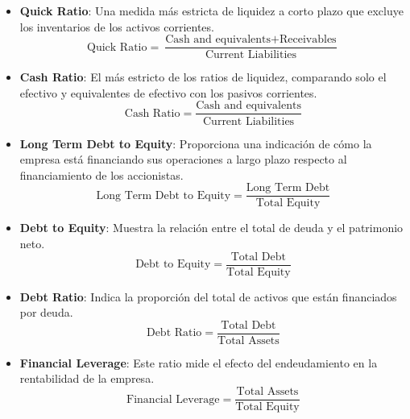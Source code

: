 \documentclass{article}
\begin{document}
\begin{itemize}
    \item \textbf{Quick Ratio}: Una medida más estricta de liquidez a corto plazo que excluye los inventarios de los activos corrientes.
    \begin{equation*}
        \text{Quick Ratio} = \frac{\text{Cash and equivalents} + \text{Receivables}}{\text{Current Liabilities}}
    \end{equation*}
    
    \item \textbf{Cash Ratio}: El más estricto de los ratios de liquidez, comparando solo el efectivo y equivalentes de efectivo con los pasivos corrientes.
    \begin{equation*}
        \text{Cash Ratio} = \frac{\text{Cash and equivalents}}{\text{Current Liabilities}}
    \end{equation*}
    
    \item \textbf{Long Term Debt to Equity}: Proporciona una indicación de cómo la empresa está financiando sus operaciones a largo plazo respecto al financiamiento de los accionistas.
    \begin{equation*}
        \text{Long Term Debt to Equity} = \frac{\text{Long Term Debt}}{\text{Total Equity}}
    \end{equation*}
    
    \item \textbf{Debt to Equity}: Muestra la relación entre el total de deuda y el patrimonio neto.
    \begin{equation*}
        \text{Debt to Equity} = \frac{\text{Total Debt}}{\text{Total Equity}}
    \end{equation*}
    
    \item \textbf{Debt Ratio}: Indica la proporción del total de activos que están financiados por deuda.
    \begin{equation*}
        \text{Debt Ratio} = \frac{\text{Total Debt}}{\text{Total Assets}}
    \end{equation*}
    
    \item \textbf{Financial Leverage}: Este ratio mide el efecto del endeudamiento en la rentabilidad de la empresa.
    \begin{equation*}
        \text{Financial Leverage} = \frac{\text{Total Assets}}{\text{Total Equity}}
    \end{equation*}
\end{itemize}
\end{document}
